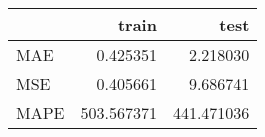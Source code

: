 \begin{tabular}{lrr}
\toprule
{} &       train &        test \\
\midrule
MAE  &    0.425351 &    2.218030 \\
MSE  &    0.405661 &    9.686741 \\
MAPE &  503.567371 &  441.471036 \\
\bottomrule
\end{tabular}
